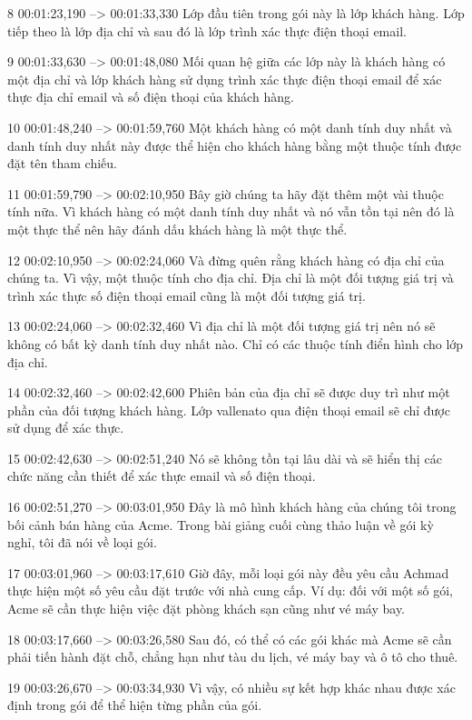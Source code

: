 8
00:01:23,190 --> 00:01:33,330
Lớp đầu tiên trong gói này là lớp khách hàng.  Lớp tiếp theo là lớp địa chỉ và sau đó là lớp trình xác thực điện thoại email.

9
00:01:33,630 --> 00:01:48,080
Mối quan hệ giữa các lớp này là khách hàng có một địa chỉ và lớp khách hàng sử dụng trình xác thực điện thoại email để xác thực địa chỉ email và số điện thoại của khách hàng.

10
00:01:48,240 --> 00:01:59,760
Một khách hàng có một danh tính duy nhất và danh tính duy nhất này được thể hiện cho khách hàng bằng một thuộc tính được đặt tên tham chiếu.

11
00:01:59,790 --> 00:02:10,950
Bây giờ chúng ta hãy đặt thêm một vài thuộc tính nữa.  Vì khách hàng có một danh tính duy nhất và nó vẫn tồn tại nên đó là một thực thể nên hãy đánh dấu khách hàng là một thực thể.

12
00:02:10,950 --> 00:02:24,060
Và đừng quên rằng khách hàng có địa chỉ của chúng ta.  Vì vậy, một thuộc tính cho địa chỉ.  Địa chỉ là một đối tượng giá trị và trình xác thực số điện thoại email cũng là một đối tượng giá trị.

13
00:02:24,060 --> 00:02:32,460
Vì địa chỉ là một đối tượng giá trị nên nó sẽ không có bất kỳ danh tính duy nhất nào.  Chỉ có các thuộc tính điển hình cho lớp địa chỉ.

14
00:02:32,460 --> 00:02:42,600
Phiên bản của địa chỉ sẽ được duy trì như một phần của đối tượng khách hàng.  Lớp vallenato qua điện thoại email sẽ chỉ được sử dụng để xác thực.

15
00:02:42,630 --> 00:02:51,240
Nó sẽ không tồn tại lâu dài và sẽ hiển thị các chức năng cần thiết để xác thực email và số điện thoại.

16
00:02:51,270 --> 00:03:01,950
Đây là mô hình khách hàng của chúng tôi trong bối cảnh bán hàng của Acme.  Trong bài giảng cuối cùng thảo luận về gói kỳ nghỉ, tôi đã nói về loại gói.

17
00:03:01,960 --> 00:03:17,610
Giờ đây, mỗi loại gói này đều yêu cầu Achmad thực hiện một số yêu cầu đặt trước với nhà cung cấp.  Ví dụ: đối với một số gói, Acme sẽ cần thực hiện việc đặt phòng khách sạn cũng như vé máy bay.

18
00:03:17,660 --> 00:03:26,580
Sau đó, có thể có các gói khác mà Acme sẽ cần phải tiến hành đặt chỗ, chẳng hạn như tàu du lịch, vé máy bay và ô tô cho thuê.

19
00:03:26,670 --> 00:03:34,930
Vì vậy, có nhiều sự kết hợp khác nhau được xác định trong gói để thể hiện từng phần của gói.

